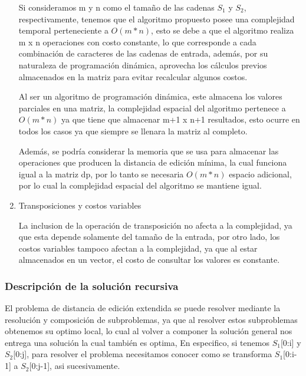 \begin{enumerate}[1)]
    Si consideramos m y n como el tamaño de las cadenas $S_1$ y $S_2$, 
    respectivamente, tenemos que
    el algoritmo propuesto posee una complejidad temporal 
    perteneciente a $O\left(m*n\right)$, esto
    se debe a que el algoritmo realiza m x n operaciones con costo constante, lo que corresponde
    a cada combinación de caracteres de las cadenas de entrada, además, por su naturaleza
    de programación dinámica, aprovecha los cálculos previos almacenados en la matriz para 
    evitar recalcular algunos costos.
    
    Al ser un algoritmo de programación dinámica, este almacena los valores parciales en una matriz, 
    la complejidad espacial del algoritmo pertenece a $O\left(m*n\right)$ 
    ya que tiene que almacenar m+1 x n+1 resultados, esto ocurre en todos los casos
    ya que siempre se llenara la matriz al completo.
    
    Además, se podría considerar la memoria que se usa para almacenar las operaciones
    que producen la distancia de edición mínima, la cual funciona igual a la matriz dp,
    por lo tanto se necesaria $O\left(m*n\right)$ espacio adicional, por lo cual
    la complejidad espacial del algoritmo se mantiene igual.


    \item Transposiciones y costos variables
    
    La inclusion de la operación de transposición no afecta
    a la complejidad, ya que esta depende solamente del tamaño de la entrada,
    por otro lado, los costos variables tampoco afectan a la complejidad, ya que
    al estar almacenados en un vector, el costo de consultar los valores es constante.

\end{enumerate}

\subsubsection{Descripción de la solución recursiva}

El problema de distancia de edición extendida se puede resolver
mediante la resolución y composición
de subproblemas, ya que al resolver estos subproblemas obtenemos
su optimo local, lo cual al volver a componer la solución general
nos entrega una solución la cual también es optima, En especifico,
si tenemos $S_1$[0:i] y $S_2$[0:j], para resolver el problema
necesitamos conocer como se transforma $S_1$[0:i-1] a $S_2$[0:j-1], asi sucesivamente.

